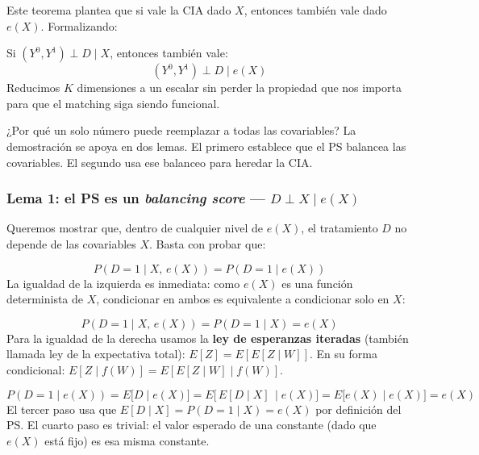 \documentclass[
  letterpaper,
  DIV=11,
  numbers=noendperiod,
  oneside]{scrreprt}
\begin{document}
\begin{tcolorbox}[enhanced jigsaw, breakable, rightrule=.15mm, colbacktitle=quarto-callout-warning-color!10!white, bottomtitle=1mm, arc=.35mm, titlerule=0mm, left=2mm, toprule=.15mm, leftrule=.75mm, colback=white, opacitybacktitle=0.6, opacityback=0, colframe=quarto-callout-warning-color-frame, bottomrule=.15mm, coltitle=black, toptitle=1mm, title={Teorema del propensity score}]
Este teorema plantea que si vale la CIA dado \(X\), entonces también
vale dado \(e(X)\). Formalizando:

Si \((Y^0, Y^1) \perp D \mid X\), entonces también vale:
\[(Y^0, Y^1) \perp D \mid e(X)\] Reducimos \(K\) dimensiones a un
escalar sin perder la propiedad que nos importa para que el matching
siga siendo funcional.

¿Por qué un solo número puede reemplazar a todas las covariables? La
demostración se apoya en dos lemas. El primero establece que el PS
balancea las covariables. El segundo usa ese balanceo para heredar la
CIA.

\hypertarget{lema-1-el-ps-es-un-balancing-score-d-perp-x-mid-ex}{%
\subsubsection{\texorpdfstring{Lema 1: el PS es un \emph{balancing
score} ---
\(D \perp X \mid e(X)\)}{Lema 1: el PS es un balancing score --- D \textbackslash perp X \textbackslash mid e(X)}}\label{lema-1-el-ps-es-un-balancing-score-d-perp-x-mid-ex}}

Queremos mostrar que, dentro de cualquier nivel de \(e(X)\), el
tratamiento \(D\) no depende de las covariables \(X\). Basta con probar
que:

\[P(D = 1 \mid X,\, e(X)) = P(D = 1 \mid e(X))\] La igualdad de la
izquierda es inmediata: como \(e(X)\) es una función determinista de
\(X\), condicionar en ambos es equivalente a condicionar solo en \(X\):

\[P(D = 1 \mid X,\, e(X)) = P(D = 1 \mid X) = e(X)\] Para la igualdad de
la derecha usamos la \textbf{ley de esperanzas iteradas} (también
llamada ley de la expectativa total): \(E[Z] = E[E[Z \mid W]]\). En su
forma condicional: \(E[Z \mid f(W)] = E[E[Z \mid W] \mid f(W)]\).

\[P(D = 1 \mid e(X)) = E\bigl[D \mid e(X)\bigr] = E\bigl[\,E[D \mid X]\,\mid e(X)\bigr] = E\bigl[e(X) \mid e(X)\bigr] = e(X)\]
El tercer paso usa que \(E[D \mid X] = P(D = 1 \mid X) = e(X)\) por
definición del PS. El cuarto paso es trivial: el valor esperado de una
constante (dado que \(e(X)\) está fijo) es esa misma constante.


\end{tcolorbox}
\end{document}
